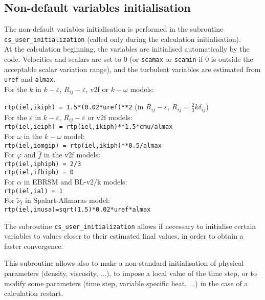 {{%
\subsection{Non-default variables initialisation} \label{sec:cs_user_initialization}

The non-default variables initialisation is performed in the subroutine \texttt{cs\_user\_initialization} (called only during the calculation initialisation).\\ At the calculation beginning, the variables are initialised
automatically by the code. Velocities and scalars are set to 0 (or \texttt{scamax} or \texttt{scamin} if 0 is outside the acceptable
scalar variation range), and the turbulent variables are estimated from
\texttt{uref} and \texttt{almax}. \\
For the $k$ in $k-\varepsilon$, $R_{ij}-\varepsilon$, v2f or $k-\omega$
models:\\
{\texttt{rtp(iel,ikiph) = 1.5*(0.02*uref)**2}
(in $R_{ij}-\varepsilon$,  $R_{ij}=\frac{2}{3}k\delta_{ij}$)\\
For the $\varepsilon$ in $k-\varepsilon$, $R_{ij}-\varepsilon$ or v2f models:\\
\texttt{rtp(iel,ieiph) = rtp(iel,ikiph)**1.5*cmu/almax}\\
For $\omega$ in the $k-\omega$ model:\\
\texttt{rtp(iel,iomgip) = rtp(iel,ikiph)**0.5/almax}\\
For $\varphi$ and $\overline{f}$ in the v2f models:\\
\texttt{rtp(iel,iphiph) = 2/3}\\
\texttt{rtp(iel,ifbiph) = 0}\\
For $\alpha$ in EBRSM and BL-v2/k models:\\
\texttt{rtp(iel,ial) = 1}\\
For $\tilde{\nu}_t$ in Spalart-Allmaras model:\\
\texttt{rtp(iel,inusa)=sqrt(1.5)*0.02*uref*almax}

The subroutine \texttt{cs\_user\_initialization} allows if necessary to initialise certain
variables to values closer to their estimated final values, in order to
obtain a faster convergence.

This subroutine allows also to make a non-standard initialisation of
physical parameters (density, viscosity, ...), to impose a local
value of the time step, or to modify some parameters (time step,
variable specific heat, ...) in the case of a calculation restart.

}}}

